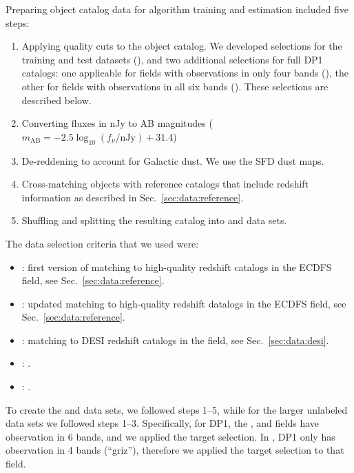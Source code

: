 Preparing object catalog \citep{10.71929/rubin/2570325} data for \photoz algorithm training and estimation included five steps:

\begin{enumerate}
\item{Applying quality cuts to the object catalog.   We developed selections for the training and test datasets (), and two additional selections for full DP1 catalogs: one applicable for fields with observations in only four bands (), the other for fields with observations in all six bands ().  These selections are described below.}
\item{Converting fluxes in nJy to AB magnitudes ($m_\text{AB} = -2.5 \log_{10}(f_\nu / \text{nJy}) + 31.4$)}
\item{De-reddening to account for Galactic dust.  We use the SFD dust maps\citep{SFD}.}
\item{Cross-matching objects with reference catalogs that include redshift information as described in Sec.~\ref{sec:data:reference}.}
\item{Shuffling and splitting the resulting catalog into  and  data sets.}
\end{enumerate}

The data selection criteria that we used were:
\begin{itemize}
\item{: first version of matching to high-quality redshift catalogs in the ECDFS field,  see Sec.~\ref{sec:data:reference}.}
\item{: updated matching to high-quality redshift datalogs in the ECDFS field, see Sec.~\ref{sec:data:reference}.}
\item{: matching to DESI redshift catalogs in the  field, see Sec.~\ref{sec:data:desi}.}
\item{: .}
\item{: .}
\end{itemize}

To create the  and  data sets, we followed steps 1--5, while for the larger unlabeled data sets we followed steps 1--3.  Specifically, for DP1, the ,  and  fields have observation in 6 bands, and we applied the  target selection.   In , DP1 only has observation in 4 bands (``griz''), therefore we applied the  target selection to that field. 


